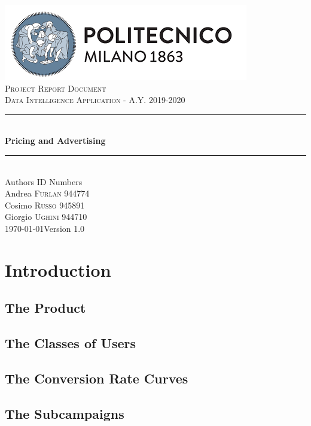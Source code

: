 \documentclass[12pt]{article}
\begin{document}
	\begin{titlepage}
		\newcommand{\HRule}{\rule{\linewidth}{0.7mm}}
		\center
		\includegraphics{PolimiLogo.png}\\[1cm]
		
		\textsc{\LARGE Project Report Document}\\[1cm]
		\textsc{\large Data Intelligence Application - A.Y. 2019-2020}\\[1cm]
		\HRule \\[0.4cm]
		{ \huge \bfseries Pricing and Advertising}\\[0.15cm]
		\HRule \\[1.5cm]
		{\large Authors  \hfill ID Numbers}\\[0.4cm]
		{\large Andrea \textsc{Furlan}  \hfill 944774}\\[0.2cm]
		{\large Cosimo \textsc{Russo}  \hfill 945891}\\[0.2cm]
		{\large Giorgio \textsc{Ughini} \hfill 944710}\\[2cm]
		{\large \today  \hfill Version 1.0}
		\vfill
	\end{titlepage}
	\clearpage
	{\hypersetup{hidelinks}\tableofcontents}
	\clearpage
	\section{Introduction}
	\subsection{The Product}
	
	\subsection{The Classes of Users}
	
	\subsection{The Conversion Rate Curves}
	
	\subsection{The Subcampaigns}
	
\end{document}
